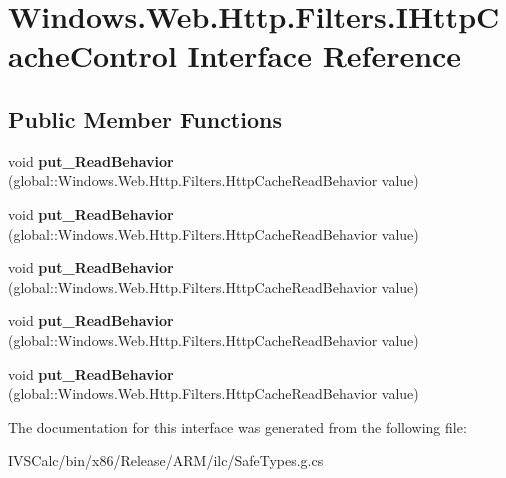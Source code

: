\hypertarget{interface_windows_1_1_web_1_1_http_1_1_filters_1_1_i_http_cache_control}{}\section{Windows.\+Web.\+Http.\+Filters.\+I\+Http\+Cache\+Control Interface Reference}
\label{interface_windows_1_1_web_1_1_http_1_1_filters_1_1_i_http_cache_control}
\subsection*{Public Member Functions}
\begin{DoxyCompactItemize}
\item 
\mbox{\label{interface_windows_1_1_web_1_1_http_1_1_filters_1_1_i_http_cache_control_a7b5e3858197a3e6b161e8fe470839959}} 
void {\bfseries put\+\_\+\+Read\+Behavior} (global\+::\+Windows.\+Web.\+Http.\+Filters.\+Http\+Cache\+Read\+Behavior value)
\item 
\mbox{\label{interface_windows_1_1_web_1_1_http_1_1_filters_1_1_i_http_cache_control_a7b5e3858197a3e6b161e8fe470839959}} 
void {\bfseries put\+\_\+\+Read\+Behavior} (global\+::\+Windows.\+Web.\+Http.\+Filters.\+Http\+Cache\+Read\+Behavior value)
\item 
\mbox{\label{interface_windows_1_1_web_1_1_http_1_1_filters_1_1_i_http_cache_control_a7b5e3858197a3e6b161e8fe470839959}} 
void {\bfseries put\+\_\+\+Read\+Behavior} (global\+::\+Windows.\+Web.\+Http.\+Filters.\+Http\+Cache\+Read\+Behavior value)
\item 
\mbox{\label{interface_windows_1_1_web_1_1_http_1_1_filters_1_1_i_http_cache_control_a7b5e3858197a3e6b161e8fe470839959}} 
void {\bfseries put\+\_\+\+Read\+Behavior} (global\+::\+Windows.\+Web.\+Http.\+Filters.\+Http\+Cache\+Read\+Behavior value)
\item 
\mbox{\label{interface_windows_1_1_web_1_1_http_1_1_filters_1_1_i_http_cache_control_a7b5e3858197a3e6b161e8fe470839959}} 
void {\bfseries put\+\_\+\+Read\+Behavior} (global\+::\+Windows.\+Web.\+Http.\+Filters.\+Http\+Cache\+Read\+Behavior value)
\end{DoxyCompactItemize}


The documentation for this interface was generated from the following file\+:\begin{DoxyCompactItemize}
\item 
I\+V\+S\+Calc/bin/x86/\+Release/\+A\+R\+M/ilc/Safe\+Types.\+g.\+cs\end{DoxyCompactItemize}
